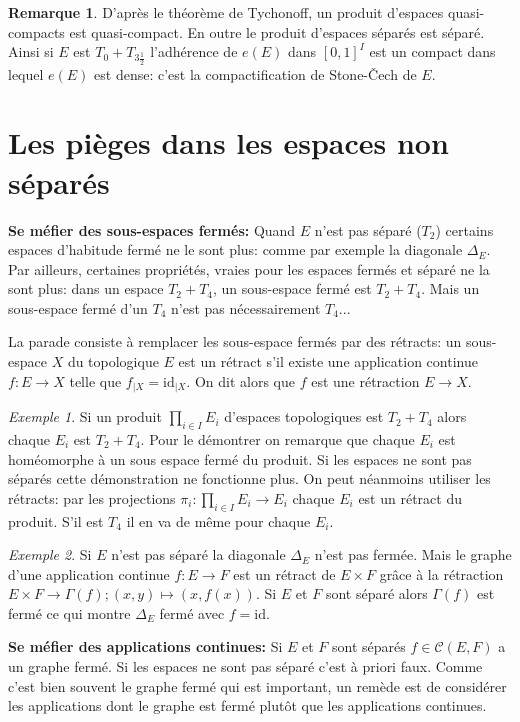 \documentclass[a4paper, 11pt, french]{book}
\theoremstyle{plain} %
\theoremstyle{definition} %
\newtheorem{remarque}{Remarque}
\theoremstyle{remark} %
\newtheorem{exemple}{Exemple}
\newcommand{\1}{\mathds{1}}
\newcommand{\id}{\mathrm{id}}
\renewcommand{\cal}[1]{\mathcal{#1}}
\begin{document}
\begin{remarque}
	D'après le théorème de Tychonoff, un produit d'espaces quasi-compacts est quasi-compact.
	En outre le produit d'espaces séparés est séparé.
	Ainsi si $E$ est $T_0+T_{3\frac{1}{2}}$ l'adhérence de $e(E)$ dans $[0, 1]^I$ est un compact dans lequel $e(E)$ est dense: c'est la compactification de Stone-Čech de $E$.
\end{remarque}


\section{Les pièges dans les espaces non séparés}

\textbf{Se méfier des sous-espaces fermés:}
Quand $E$ n'est pas séparé ($T_2$) certains espaces d'habitude fermé ne le sont plus: comme par exemple la diagonale $\Delta_E$.
Par ailleurs, certaines propriétés, vraies pour les espaces fermés et séparé ne la sont plus: dans un espace $T_2+T_4$, un sous-espace fermé est $T_2+T_4$.
Mais un sous-espace fermé d'un $T_4$ n'est pas nécessairement $T_4$...

La parade consiste à remplacer les sous-espace fermés par des rétracts: un sous-espace $X$ du topologique $E$ est un rétract s'il existe une application continue $f:E\rightarrow X$ telle que $f_{\vert X}=\id_{\vert X}$.
On dit alors que $f$ est une rétraction $E\rightarrow X$.

\begin{exemple}
	Si un produit $\prod_{i\in I}E_i$ d'espaces topologiques est $T_2+T_4$ alors chaque $E_i$ est $T_2+T_4$.
	Pour le démontrer on remarque que chaque $E_i$ est homéomorphe à un sous espace fermé du produit.
	Si les espaces ne sont pas séparés cette démonstration ne fonctionne plus.
	On peut néanmoins utiliser les rétracts: par les projections $\pi_i:\prod_{i\in I}E_i\rightarrow E_i$ chaque $E_i$ est un rétract du produit.
	S'il est $T_4$ il en va de même pour chaque $E_i$.
\end{exemple}


\begin{exemple}
	Si $E$ n'est pas séparé la diagonale $\Delta_E$ n'est pas fermée.
	Mais le graphe d'une application continue $f:E\rightarrow F$ est un rétract de $E\times F$ grâce à la rétraction $E\times F\rightarrow\Gamma(f); (x, y)\mapsto(x, f(x))$.
	Si $E$ et $F$ sont séparé alors $\Gamma(f)$ est fermé ce qui montre $\Delta_E$ fermé avec $f=\id$.
\end{exemple}

\textbf{Se méfier des applications continues:}
Si $E$ et $F$ sont séparés $f\in\cal{C}(E, F)$ a un graphe fermé.
Si les espaces ne sont pas séparé c'est à priori faux.
Comme c'est bien souvent le graphe fermé qui est important, un remède est de considérer les applications dont le graphe est fermé plutôt que les applications continues.
\end{document}
